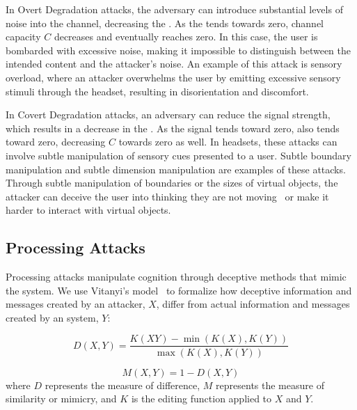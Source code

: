 In Overt Degradation attacks, the adversary can introduce substantial levels of noise into the channel, decreasing the \SNR. As the \SNR tends towards zero, channel capacity \({C}\) decreases and eventually reaches zero.
In this case, the user is bombarded with excessive noise, making it impossible to distinguish between the intended content and the attacker's noise. 
An example of this attack is sensory overload, where an attacker overwhelms the user by emitting excessive sensory stimuli through the \MR headset, resulting in disorientation and discomfort.

In Covert Degradation attacks, an adversary can reduce the signal strength, which results in a decrease in the \SNR. As the signal tends toward zero, \SNR also tends toward zero, decreasing \({C}\) towards zero as well. In \MR headsets, these attacks can involve subtle manipulation of sensory cues presented to a user. Subtle boundary manipulation and subtle dimension manipulation are examples of these attacks. Through subtle manipulation of boundaries or the sizes of virtual objects, the attacker can deceive the user into thinking they are not moving~\cite{Casey_2021} or make it harder to interact with virtual objects.

\subsection{Processing Attacks}
Processing attacks manipulate cognition through deceptive methods that mimic the \MR system.
We use Vitanyi's model~\cite{Vitanyi} to formalize how deceptive information and messages created by an attacker, \({X}\), differ from actual information and messages created by an \MR system, \({Y}\):

\begin{equation}
D(X, Y) = \frac{K(XY) - \min(K(X), K(Y))}{\max(K(X), K(Y))}
\end{equation}

\begin{equation}
M(X, Y) = 1 - D(X, Y)
\end{equation}
where \({D}\) represents the measure of difference, \({M}\) represents the measure of similarity or mimicry, and \({K}\) is the editing function applied to \({X}\) and \({Y}\).

